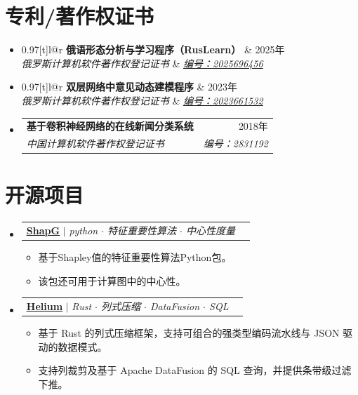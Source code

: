 \documentclass[letterpaper,10pt,fontset=none]{ctexart}
\makeatletter
\newcommand{\link}[2]{\href{#1}{\color{blue}\underline{#2}}}
\newcommand{\resumeItem}[1]{
  \item\small{
    {#1 \vspace{-2pt}}
  }
}
\newcommand{\resumeSubheading}[4]{
  \vspace{-2pt}\item
  \begin{tabular*}{0.97\textwidth}[t]{l@{\extracolsep{\fill}}r}
    \textbf{#1} & #2 \\
    \textit{\small#3} & \textit{\small #4} \\
  \end{tabular*}\vspace{-7pt}
}
\newcommand{\resumeProjectHeading}[2]{
  \item
  \begin{tabular*}{0.97\textwidth}{l@{\extracolsep{\fill}}r}
    \small#1 & #2 \\
  \end{tabular*}\vspace{-7pt}
}
\newenvironment{resumeSubHeadingList}{\begin{itemize}[leftmargin=0.15in, label={}]}{\end{itemize}}
\newenvironment{resumeItemList}{\begin{itemize}}{\end{itemize}}
\makeatother
\begin{document}
\section{专利/著作权证书}
\begin{resumeSubHeadingList}
  \resumeSubheading
    {俄语形态分析与学习程序（RusLearn）}{2025年}
    {俄罗斯计算机软件著作权登记证书}{{\link{https://new.fips.ru/registers-doc-view/fips_servlet?DB=EVM&DocNumber=2025696456&TypeFile=html}{编号：2025696456}}}

  \resumeSubheading
    {双层网络中意见动态建模程序}{2023年}
    {俄罗斯计算机软件著作权登记证书}{{\link{https://new.fips.ru/registers-doc-view/fips_servlet?DB=EVM&DocNumber=2023661532&TypeFile=html}{编号：2023661532}}}

  \resumeSubheading
    {基于卷积神经网络的在线新闻分类系统}{2018年}
    {中国计算机软件著作权登记证书}{编号：2831192}
\end{resumeSubHeadingList}

\section{开源项目}
\begin{resumeSubHeadingList}

  \resumeProjectHeading{
    \link{https://github.com/vectorsss/shapG}{\textbf{ShapG}} $|$
    \emph{python $\cdot$ 特征重要性算法 $\cdot$ 中心性度量}}{}
  \begin{resumeItemList}
    \resumeItem{基于Shapley值的特征重要性算法Python包。}
    \resumeItem{该包还可用于计算图中的中心性。}
  \end{resumeItemList}

  \resumeProjectHeading{
    \link{https://github.com/vectorsss/helium-columnar}{\textbf{Helium}} $|$
    \emph{Rust $\cdot$ 列式压缩 $\cdot$ DataFusion $\cdot$ SQL}}{}
  \begin{resumeItemList}
    \resumeItem{基于 Rust 的列式压缩框架，支持可组合的强类型编码流水线与 JSON 驱动的数据模式。}
    \resumeItem{支持列裁剪及基于 Apache DataFusion 的 SQL 查询，并提供条带级过滤下推。}
  \end{resumeItemList}
\end{resumeSubHeadingList}
\end{document}

